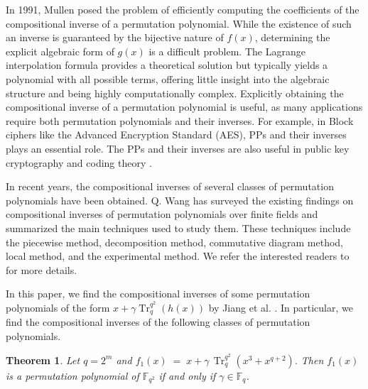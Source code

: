 \documentclass{birkjour}
\newtheorem{thm}{Theorem}[section]
\theoremstyle{definition}
\theoremstyle{remark}
\numberwithin{equation}{section}
\begin{document}
	
	In 1991, Mullen \cite{Mullen G.L.} posed the problem of efficiently computing the coefficients of the compositional inverse of a permutation polynomial. While the existence of such an inverse is guaranteed by the bijective nature of $f(x)$, determining the explicit algebraic form of $g(x)$ is a difficult problem.  The Lagrange interpolation formula provides a theoretical solution but typically yields a polynomial with all possible terms, offering little insight into the algebraic structure and being highly computationally complex.  Explicitly obtaining the compositional inverse of a permutation polynomial is useful, as many applications require both permutation polynomials and their inverses. 
	For example, in Block ciphers like the Advanced Encryption Standard (AES), PPs and their inverses plays an essential role. The PPs and their inverses are also useful in public key cryptography  and coding theory \cite{rajesh1, rajesh2, ding2013cyclic, li2023further, hou1997results}.
	
	In recent years, the compositional inverses of several classes of permutation polynomials have been obtained. Q. Wang \cite{ wang2025survey} has surveyed the existing findings on compositional inverses of permutation polynomials over finite fields and summarized the main techniques used to study them. These techniques include the piecewise method, decomposition method, commutative diagram method, local method, and the experimental method.
	We refer the interested readers to 
	  \cite{doi:10.1142/S0219498822502206,  coulter2002compositional, li2019compositional, muratovic2007note, niu2021finding, tuxanidy2014inverses, tuxanidy2017compositional, wang2009inverse, wang2017note, wu2014compositional, wu2024permutation, yuan2022compositional, yuan2024local, zheng2018inverses, zheng2019inverses, zheng2023inverses,wu2025compositional2,wu2025compositional} for more details.
	
	
 In this paper, we find the compositional inverses of some permutation polynomials of the form $x+\gamma\operatorname{Tr}_q^{q^2}(h(x))$ by Jiang et al. \cite{JIANG2025102522}. In particular, we find the compositional inverses of the following classes of permutation polynomials. 
	\begin{thm}\cite{JIANG2025102522}
	Let $q = 2^m$ and 
	\(
	f_1(x) \;=\; x + \gamma \, \operatorname{Tr}_{q}^{q^2}(x^3 + x^{q+2}).
	\)
	Then $f_1(x)$ is a permutation polynomial of $\mathbb{F}_{q^2}$ if and only if $\gamma \in \mathbb{F}_q$.
\end{thm}
\end{document}
